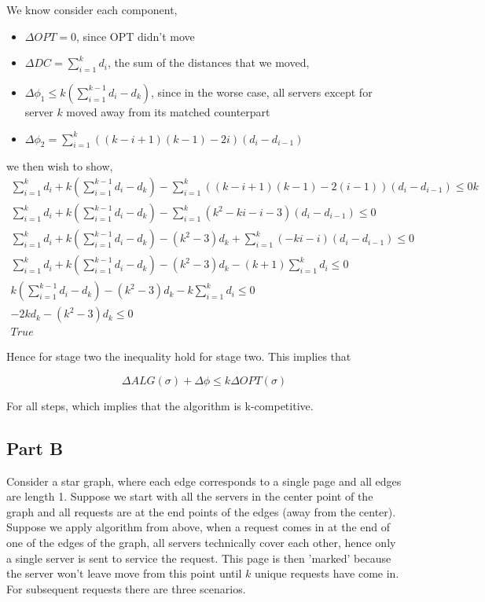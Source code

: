 \documentclass[a4paper]{article}
\begin{document}
We know consider 
each component, 
\begin{itemize}
		\item $\Delta OPT = 0$, since OPT didn't move
		\item $\Delta DC = \sum_{i=1}^k d_i$, the sum of the distances that we moved,
		\item $\Delta\phi_1 \leq k(\sum_{i=1}^{k-1} d_i - d_k)$, since in the worse case, all servers except for server $k$ moved away from its matched counterpart
		\item $\Delta\phi_2 = \sum_{i=1}^k((k-i+1)(k-1) - 2i)(d_i - d_{i-1})$
\end{itemize}


we then wish to show,
\begin{align*}
	\sum_{i=1}^k d_i + k(\sum_{i=1}^{k-1} d_i - d_k) - \sum_{i=1}^k((k-i+1)(k-1) - 2(i-1))(d_i - d_{i-1}) \leq 0k\\
		\sum_{i=1}^k d_i + k(\sum_{i=1}^{k-1} d_i - d_k) - \sum_{i=1}^k(k^2-ki-i-3)(d_i - d_{i-1}) \leq 0\\
		\sum_{i=1}^k d_i + k(\sum_{i=1}^{k-1} d_i - d_k) - (k^2-3)d_k + \sum_{i=1}^{k}(-ki-i)(d_i - d_{i-1}) \leq 0\\
		\sum_{i=1}^k d_i + k(\sum_{i=1}^{k-1} d_i - d_k) - (k^2-3)d_k - (k+1)\sum_{i=1}^{k}d_i  \leq 0\\
		k(\sum_{i=1}^{k-1} d_i - d_k) - (k^2-3)d_k - k\sum_{i=1}^{k}d_i  \leq 0\\
		-2kd_k - (k^2-3)d_k  \leq 0\\
		True
\end{align*}

Hence for stage two the inequality hold for stage two. This implies that 

\begin{equation}
\Delta ALG(\sigma) + \Delta\phi \leq k \Delta OPT(\sigma)
\end{equation}

For all steps, which implies that the algorithm is k-competitive.

\subsection{Part B}

Consider a star graph, where each edge corresponds to a single page and all edges are length 1. 
Suppose we start with all the servers in the center point of the graph and all requests
are at the end points of the edges (away from the center). Suppose we apply algorithm from above, when a request comes in
at the end of one of the edges of the graph,
all servers technically cover each other, hence only a single server is sent to service the request. 
This page is then 'marked' because the server won't leave move from this point until $k$ unique requests have 
come in.  For subsequent requests there are three scenarios. 
\end{document}
